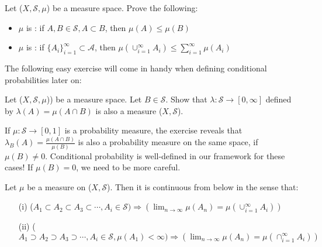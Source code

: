 \documentclass[11pt]{scrartcl}
\begin{document}

\begin{exercise}
Let ($X,\mathcal{S},\mu$) be a measure space. Prove the following:
\begin{itemize}
\item $\mu$ is : if $A, B \in \mathcal{S}, A \subset B$, then $\mu(A)\leq \mu(B)$
\item $\mu$ is : if $\{A_i\}_{i=1}^\infty \subset \mathcal{A}$, then $\mu(\cup_{i=1}^\infty A_i) \leq \sum_{i=1}^\infty \mu(A_i)$
\end{itemize}
\end{exercise}

The following easy exercise will come in handy when defining conditional probabilities later on:

\begin{exercise}
Let ($X,\mathcal{S},\mu$)) be a measure space. Let $B \in \mathcal{S}$. Show that $\lambda : \mathcal{S} \rightarrow [0,\infty]$ defined by $\lambda(A) = \mu(A\cap B)$ is also a measure ($X,\mathcal{S}$). 
\end{exercise}

\begin{example}
If $\mu : \mathcal{S} \rightarrow [0,1]$ is a probability measure, the exercise reveals that $\lambda_B(A) = \frac{\mu(A\cap B)}{\mu(B)}$ is also a probability measure on the same space, if $\mu(B) \neq 0$. Conditional probability is well-defined in our framework for these cases! If $\mu(B) = 0$, we need to be more careful.
\end{example}{}

\begin{theorem}
Let $\mu$ be a measure on ($X,\mathcal{S}$). Then it is continuous from below in the sense that:
\begin{itemize}
\item[(i)] ($A_1 \subset A_2 \subset A_3 \subset \cdots , A_i \in \mathcal{S}) \Rightarrow (\lim_{n\rightarrow \infty} \mu(A_n) = \mu(\cup_{i=1}^\infty A_i) )$
\item[(ii)] ($A_1 \supset A_2 \supset A_3 \supset \cdots , A_i \in \mathcal{S}, \mu(A_1) < \infty) \Rightarrow (\lim_{n\rightarrow \infty} \mu(A_n) = \mu(\cap_{i=1}^\infty A_i) )$
\end{itemize}
\end{theorem}
\end{document}
